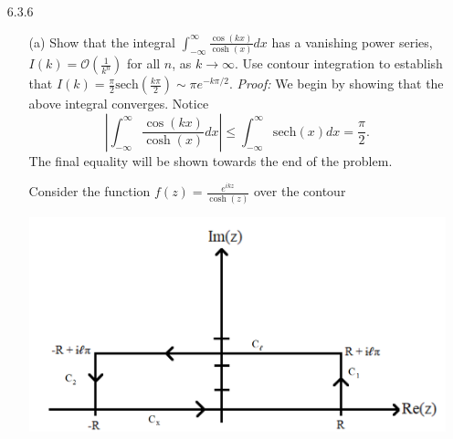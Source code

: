\documentclass{article}
\begin{document}
\begin{itemize}
    \pagebreak

    \item[6.3.6] 
    \begin{itemize}
        \item[(a)] Show that the integral ${\displaystyle \int_{-\infty}^{\infty} \frac{\cos(kx)}{\cosh(x)}dx }$ has a vanishing power series, $I(k) = \mathcal{O}\left(\frac{1}{k^n}\right)$ for all $n$, as $k \to \infty$. Use contour integration to establish that $I(k) = \frac{\pi}{2}\text{sech}\left(\frac{k\pi}{2}\right) \sim \pi e^{-k\pi/2}$.
        \newline\newline
        \textit{Proof:} We begin by showing that the above integral converges. Notice
        \[\left|\int_{-\infty}^{\infty}\frac{\cos(kx)}{\cosh(x)}dx\right| \leq \int_{-\infty}^{\infty}\text{sech}(x)dx = \frac{\pi}{2}.\]
        The final equality will be shown towards the end of the problem.
        
        
        Consider the function $f(z) = \frac{e^{ikz}}{\cosh(z)}$ over the contour 

        \begin{center}
            \includegraphics[scale = 0.3]{box_contour.PNG}
        \end{center}


\end{itemize}
\end{itemize}
\end{document}
